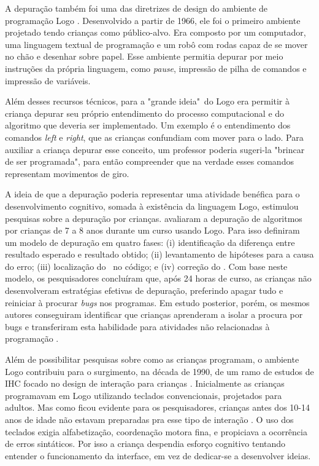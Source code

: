 A depuração também foi uma das diretrizes de design do ambiente de programação Logo \cite{solomon_history_2020}. Desenvolvido a partir de 1966, ele foi o primeiro ambiente projetado tendo crianças como público-alvo. Era composto por um computador, uma linguagem textual de programação e um robô com rodas capaz de se mover no chão e desenhar sobre papel. Esse ambiente permitia depurar por meio instruções da própria linguagem, como \textit{pause}, impressão de pilha de comandos e impressão de variáveis. 

Além desses recursos técnicos, para  a "grande ideia"\ do Logo era permitir à criança depurar seu próprio entendimento do processo computacional e do algoritmo que deveria ser implementado. Um exemplo é o entendimento dos comandos \textit{left} e \textit{right}, que as crianças confundiam com mover para o lado. Para auxiliar a criança depurar esse conceito, um professor poderia sugeri-la "brincar de ser programada", para então compreender que na verdade esses comandos representam movimentos de giro.

A ideia de que a depuração poderia representar uma atividade benéfica para o desenvolvimento cognitivo, somada à existência da linguagem Logo, estimulou pesquisas sobre a depuração por crianças.  avaliaram a depuração de algoritmos por crianças de 7 a 8 anos durante um curso usando Logo. Para isso definiram um modelo de depuração em quatro fases: (i) identificação da diferença entre resultado esperado e resultado obtido; (ii) levantamento de hipóteses para a causa do erro; (iii) localização do \bug\ no código; e (iv) correção do \bug. Com base neste modelo, os pesquisadores concluíram que, após 24 horas de curso, as crianças não desenvolveram estratégias efetivas de depuração, preferindo apagar tudo e reiniciar à procurar \textit{bugs} nos programas. Em estudo posterior, porém, os mesmos autores conseguiram identificar que crianças aprenderam a isolar a procura por bugs e transferiram esta habilidade para atividades não relacionadas à programação \cite{carver_improving_1987}.

Além de possibilitar pesquisas sobre como as crianças programam, o ambiente Logo contribuiu para o surgimento, na década de 1990, de um ramo de estudos de \ac{IHC} focado no design de interação para crianças \cite{hourcade_child-computer_2015}. Inicialmente as crianças programavam em Logo utilizando teclados convencionais, projetados para adultos. Mas como ficou evidente para os pesquisadores, crianças antes dos 10-14 anos de idade não estavam preparadas pra esse tipo de interação \cite{mcnerney_turtles_2004}. O uso dos teclados exigia alfabetização, coordenação motora fina, e propiciava a ocorrência de erros sintáticos. Por isso a criança despendia esforço cognitivo tentando entender o funcionamento da interface, em vez de dedicar-se a desenvolver ideias.

